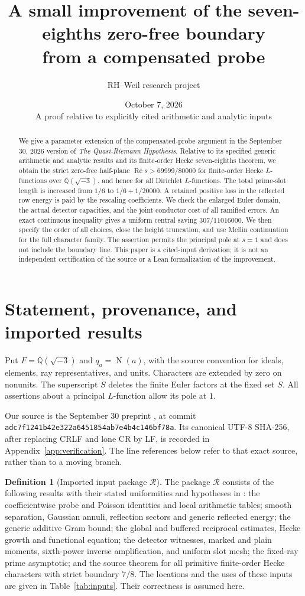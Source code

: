 \documentclass[11pt,a4paper]{article}
\title{A small improvement of the seven-eighths zero-free boundary\\from a compensated probe}
\author{RH--Weil research project}
\date{October 7, 2026\\[3pt]\small A proof relative to explicitly cited arithmetic and analytic inputs}
\theoremstyle{definition}
\newtheorem{definition}[theorem]{Definition}
\newcommand{\Rea}{\operatorname{Re}}
\newcommand{\N}{\operatorname{N}}
\newcommand{\src}[1]{\nolinkurl{#1}}
\begin{document}
\maketitle
\begin{abstract}
We give a parameter extension of the compensated-probe argument in the
September 30, 2026 version of \emph{The Quasi-Riemann Hypothesis}.
Relative to its specified generic arithmetic and analytic results and its
finite-order Hecke seven-eighths theorem, we obtain the strict zero-free
half-plane $\Rea s>69999/80000$ for finite-order Hecke $L$-functions over
$\mathbb Q(\sqrt{-3})$, and hence for all Dirichlet $L$-functions.
The total prime-slot length is increased from $1/6$ to
$1/6+1/20000$. A retained positive loss in the reflected row energy is
paid by the rescaling coefficients. We check the enlarged Euler domain,
the actual detector capacities, and the joint conductor cost of all
ramified errors. An exact continuous inequality gives a uniform central
saving $307/11016000$. We then specify the order of all choices, close
the height truncation, and use Mellin continuation for the full character
family. The assertion permits the principal pole at $s=1$ and does not
include the boundary line. This paper is a cited-input derivation;
it is not an independent certification of the source or a Lean
formalization of the improvement.
\end{abstract}
\tableofcontents

\section{Statement, provenance, and imported results}
\label{sec:inputs}
Put $F=\mathbb Q(\sqrt{-3})$ and $q_a=\N(a)$, with the source convention
for ideals, elements, ray representatives, and units. Characters are
extended by zero on nonunits. The superscript $S$ deletes the finite
Euler factors at the fixed set $S$. All assertions about a principal
$L$-function allow its pole at $1$.

Our source is the September 30 preprint \cite{OAI}, at commit
\src{adc7f1241b42e322a6451854ab7e4b4c146bf78a}. Its canonical UTF-8
SHA-256, after replacing CRLF and lone CR by LF, is recorded in
Appendix~\ref{app:verification}. The line references below refer to that
exact source, rather than to a moving branch.

\begin{definition}[Imported input package $\mathcal R$]
\label{def:R}
The package $\mathcal R$ consists of the following results with their
stated uniformities and hypotheses in \cite{OAI}: the coefficientwise
probe and Poisson identities and local arithmetic tables; smooth
separation, Gaussian annuli, reflection sectors and generic reflected
energy; the generic additive Gram bound; the global and buffered
reciprocal estimates, Hecke growth and functional equation; the
detector witnesses, marked and plain moments, sixth-power inverse
amplification, and uniform slot mesh; the fixed-ray prime asymptotic;
and the source theorem for all primitive finite-order Hecke characters
with strict boundary $7/8$.
The locations and the uses of these inputs are given in
Table~\ref{tab:inputs}. Their correctness is assumed here.
\end{definition}
\end{document}
